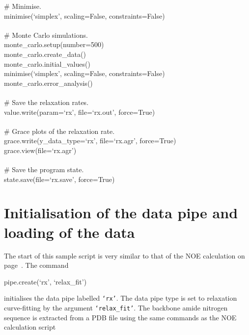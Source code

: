 \begin{exampleenv}
\# Minimise. \\
minimise(`simplex', scaling=False, constraints=False) \\
 \\
\# Monte Carlo simulations. \\
monte\_carlo.setup(number=500) \\
monte\_carlo.create\_data() \\
monte\_carlo.initial\_values() \\
minimise(`simplex', scaling=False, constraints=False) \\
monte\_carlo.error\_analysis() \\
 \\
\# Save the relaxation rates. \\
value.write(param=`rx', file=`rx.out', force=True) \\
 \\
\# Grace plots of the relaxation rate. \\
grace.write(y\_data\_type=`rx', file=`rx.agr', force=True) \\
grace.view(file=`rx.agr') \\
 \\
\# Save the program state. \\
state.save(file=`rx.save', force=True)
\end{exampleenv}




\section{Initialisation of the data pipe and loading of the data}

The start of this sample script is very similar to that of the NOE calculation on page~\pageref{NOE initialisation}.  The command

\begin{exampleenv}
pipe.create(`rx', `relax\_fit')
\end{exampleenv}

initialises the data pipe labelled \texttt{`rx'}.  The data pipe type is set to relaxation curve-fitting by the argument \texttt{`relax\_fit'}.  The backbone amide nitrogen sequence is extracted from a PDB file using the same commands as the NOE calculation script


